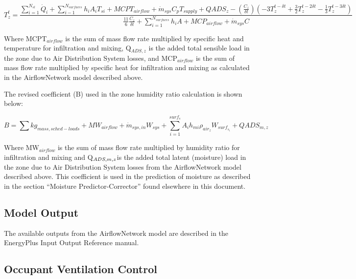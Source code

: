 {\scriptsize
\begin{equation}
T_z^t = \frac{\sum_{i=1}^{N_{sl}} \dot{Q}_i + \sum_{i-1}^{N_{surfaces}} h_i A_i T_{si} + MCPT_{airflow} + \dot{m}_{sys} C_p T_{supply} + QADS_z - \left( \frac{C_z}{\delta t} \right ) \left(-3 T_z^{t-\delta t} + \frac{3}{2} T_z^{t-2\delta t} -\frac{1}{3} T_z^{t-3\delta t} \right )}{\frac{11}{6} \frac{C_z}{\delta t} + \sum_{i=1}^{N_{surfaces}} h_i A + MCP_{airflow} + \dot{m}_{sys} C}
\end{equation}}

Where MCPT\(_{airflow}\) is the sum of mass flow rate multiplied by specific heat and temperature for infiltration and mixing, Q\(_{ADS,z}\) is the added total sensible load in the zone due to Air Distribution System losses, and MCP\(_{airflow}\) is the sum of mass flow rate multiplied by specific heat for infiltration and mixing as calculated in the AirflowNetwork model described above.

The revised coefficient (B) used in the zone humidity ratio calculation is shown below:

\begin{equation}
B = \sum kg_{mass,sched-loads} + MW_{airflow} + \dot{m}_{sys,in} W_{sys} + \sum_{i = 1}^{surf_s} A_i h_{mi} \rho_{air_z} W_{surf_{s_i}} + QADS_{m,z}
\end{equation}

Where MW\(_{airflow}\) is the sum of mass flow rate multiplied by humidity ratio for infiltration and mixing and Q\(_{ADS,m,z\\}\)is the added total latent (moisture) load in the zone due to Air Distribution System losses from the AirflowNetwork model described above. This coefficient is used in the prediction of moisture as described in the section ``Moisture Predictor-Corrector'' found elsewhere in this document.

\subsection{Model Output}\label{model-output}

The available outputs from the AirflowNetwork model are described in the EnergyPlus Input Output Reference manual.



\subsection{Occupant Ventilation Control}\label{occupant-ventilation-control}

